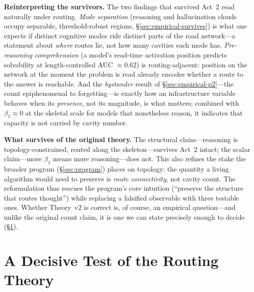 \documentclass{article}
\begin{document}
\medskip
\noindent\textbf{Reinterpreting the survivors.} The two findings that survived Act~2 read naturally
under routing. \emph{Mode separation} (reasoning and hallucination clouds occupy separable,
threshold-robust regions, \S\ref{sec:empirical-survives}) is what one expects if distinct cognitive
modes ride distinct parts of the road network---a statement about \emph{where} routes lie, not how
many cavities each mode has. \emph{Pre-reasoning comprehension} (a model's read-time activation
position predicts solvability at length-controlled AUC $\approx 0.62$) is routing-adjacent: position
on the network at the moment the problem is read already encodes whether a route to the answer is
reachable. And the \emph{bystander} result of \S\ref{sec:empirical-p2}---the count epiphenomenal to
forgetting---is exactly how an infrastructure variable behaves when its \emph{presence}, not its
magnitude, is what matters; combined with $\beta_1 \approx 0$ at the skeletal scale for models that
nonetheless reason, it indicates that capacity is not carried by cavity number.

\medskip
\noindent\textbf{What survives of the original theory.} The structural claim---reasoning is
topology-constrained, routed along the skeleton---survives Act~2 intact; the scalar claim---more
$\beta_1$ means more reasoning---does not. This also refines the stake the broader program
(\S\ref{sec:program}) places on topology: the quantity a living algorithm would need to preserve is
\emph{route connectivity}, not cavity count. The reformulation thus rescues the program's core
intuition (``preserve the structure that routes thought'') while replacing a falsified observable
with three testable ones. Whether Theory~v2 is correct is, of course, an empirical question---and
unlike the original count claim, it is one we can state precisely enough to decide (\S\ref{sec:routing-test}).

\section{A Decisive Test of the Routing Theory}
\label{sec:routing-test}
\end{document}
